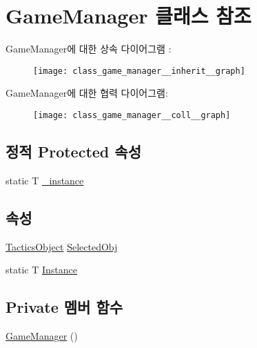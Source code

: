 \hypertarget{class_game_manager}{}\section{Game\+Manager 클래스 참조}
\label{class_game_manager}


Game\+Manager에 대한 상속 다이어그램 \+: \nopagebreak
\begin{figure}[H]
\begin{center}
\leavevmode
\texttt{[image: class\_game\_manager\_\_inherit\_\_graph]}
\end{center}
\end{figure}


Game\+Manager에 대한 협력 다이어그램\+:\nopagebreak
\begin{figure}[H]
\begin{center}
\leavevmode
\texttt{[image: class\_game\_manager\_\_coll\_\_graph]}
\end{center}
\end{figure}
\subsection*{정적 Protected 속성}
\begin{DoxyCompactItemize}
\item 
static T \hyperlink{class_m_c_n_1_1_singletone_a267e8a9e6e7c073b988cda4f95e26eb1}{\+\_\+instance}
\end{DoxyCompactItemize}
\subsection*{속성}
\begin{DoxyCompactItemize}
\item 
\hyperlink{class_tactics_object}{Tactics\+Object} \hyperlink{class_game_manager_a708d9fb61ea9f34e4c3a55d34c31acf2}{Selected\+Obj}
\item 
static T \hyperlink{class_m_c_n_1_1_singletone_a46dbbebd93e96a9592a9803c51f35602}{Instance}
\end{DoxyCompactItemize}
\subsection*{Private 멤버 함수}
\begin{DoxyCompactItemize}
\item 
\hyperlink{class_game_manager_aba36fa5d78b798e6707bd23c5ee55f19}{Game\+Manager} ()
\end{DoxyCompactItemize}
